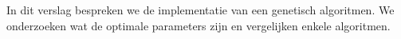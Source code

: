 In dit verslag bespreken we de implementatie van een genetisch algoritmen. We onderzoeken wat de optimale parameters zijn en vergelijken enkele algoritmen.